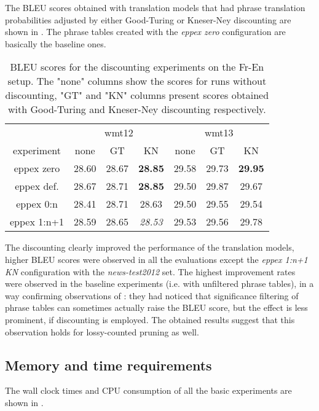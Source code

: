 The BLEU scores obtained with translation models that had phrase translation probabilities
adjusted by either Good-Turing or Kneser-Ney discounting are shown in .
The phrase tables created with the \emph{eppex zero} configuration are basically the
baseline ones.

\begin{table}[ht]
\centering
\begin{tabular}{ | c | c c c | c c c | }
\hline
 & \multicolumn{3}{|c|}{wmt12} & \multicolumn{3}{|c|}{wmt13} \\
experiment & none & GT & KN & none & GT & KN \\
\hline
\hline
eppex zero    & 28.60 & 28.67 & \textbf{28.85} & 29.58 & 29.73 & \textbf{29.95} \\
eppex def.    & 28.67 & 28.71 & \textbf{28.85} & 29.50 & 29.87 & 29.67 \\
eppex 0:n     & 28.41 & 28.71 & 28.63 & 29.50 & 29.55 & 29.54 \\
eppex 1:n+1   & 28.59 & 28.65 & \emph{28.53} & 29.53 & 29.56 & 29.78 \\
\hline
\end{tabular}
\caption{\label{fr-en-smoothed-bleu}
BLEU scores for the discounting experiments on the Fr-En setup.
The "none" columns show the scores for runs without discounting, "GT" and "KN" columns
present scores obtained with Good-Turing and Kneser-Ney discounting respectively.}
\end{table}

The discounting clearly improved the performance of the translation models,
higher BLEU scores were observed in all the evaluations except the \emph{eppex 1:n+1 KN}
configuration with the \emph{news-test2012} set.
The highest improvement rates were observed in the baseline experiments (i.e. with unfiltered
phrase tables), in a way confirming observations of \citet{johnson:sigfilter}:
they had noticed that significance filtering of phrase tables can sometimes actually raise
the BLEU score, but the effect is less prominent, if discounting is employed.
The obtained results suggest that this observation holds for lossy-counted pruning as well.

\subsection{Memory and time requirements}

The wall clock times and CPU consumption of all the basic experiments are shown
in .

